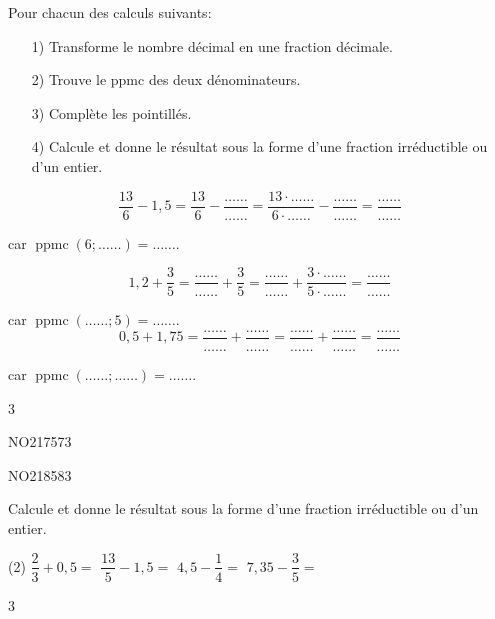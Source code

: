 \documentclass[a4paper,11pt]{report}
\begin{document}
\begin{exop}
{Pour chacun des calculs suivants:
	\begin{enumerate}
    \item[1)] Transforme le nombre décimal en une fraction décimale.
    \item[2)] Trouve le ppmc des deux dénominateurs.
    \item[3)] Complète les pointillés.
    \item[4)] Calcule et donne le résultat sous la forme d'une fraction irréductible ou d'un entier.
\end{enumerate}
\vspace{5pt}

\begin{tasks}
	\task \[\dfrac{13}{6}-1,5=\dfrac{13}{6}-\dfrac{\ldots\ldots}{\ldots\ldots}=\dfrac{13\cdot \ldots\ldots}{6\cdot \ldots\ldots}-\dfrac{\ldots\ldots}{\ldots\ldots}=\dfrac{\ldots\ldots}{\ldots\ldots}\]
\vspace{5pt}

		car $\operatorname{ppmc}(6;\ldots\ldots)=\ldots\ldots$.

	\task \[1,2+\dfrac{3}{5}=\dfrac{\ldots\ldots}{\ldots\ldots}+\dfrac{3}{5}=\dfrac{\ldots\ldots}{\ldots\ldots}+\dfrac{3\cdot \ldots\ldots}{5\cdot \ldots\ldots}=\dfrac{\ldots\ldots}{\ldots\ldots}\]
\vspace{5pt}

		car $\operatorname{ppmc}(\ldots\ldots;5)=\ldots\ldots$.
	\task \[0,5+1,75=\dfrac{\ldots\ldots}{\ldots\ldots}+\dfrac{\ldots\ldots}{\ldots\ldots}=\dfrac{\ldots\ldots}{\ldots\ldots}+\dfrac{\ldots\ldots}{\ldots\ldots}=\dfrac{\ldots\ldots}{\ldots\ldots}\]
\vspace{5pt}

		car $\operatorname{ppmc}(\ldots\ldots;\ldots\ldots)=\ldots\ldots$.
\end{tasks}}
{3}
\end{exop}


\begin{exol}{NO217}{57}{3}
\end{exol}
\begin{exol}{NO218}{58}{3}
\end{exol}

\begin{exo}
 {Calcule et donne le résultat sous la forme d'une fraction irréductible ou d'un entier.
	 \begin{tasks}(2)
\task $\dfrac{2}{3}+0,5=$
\task $\dfrac{13}{5}-1,5=$
\task $4,5-\dfrac{1}{4}=$
\task $7,35-\dfrac{3}{5}=$
\end{tasks}}
{3}
\end{exo}
\end{document}
